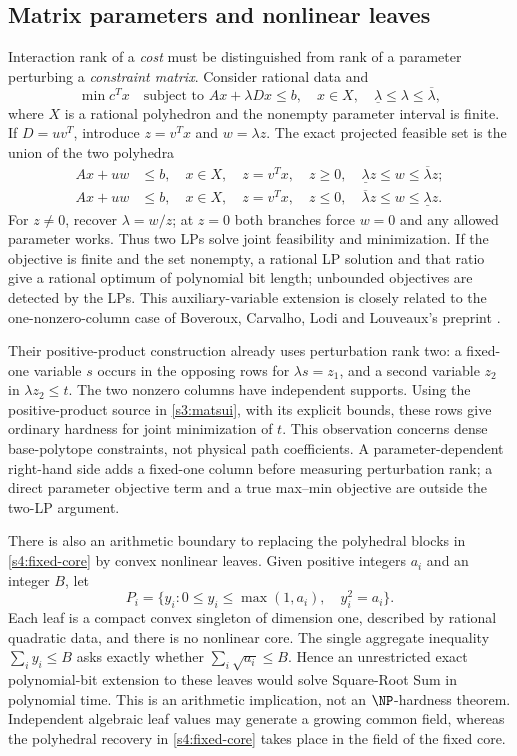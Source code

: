 \subsection{Matrix parameters and nonlinear leaves}\label{s6:parametric}
Interaction rank of a \emph{cost} must be distinguished from rank of a
parameter perturbing a \emph{constraint matrix}.
Consider rational data and
\[
 \min c^Tx\quad\text{subject to }Ax+\lambda Dx\le b,
 \quad x\in X,\quad\underline\lambda\le\lambda\le\overline\lambda,
\]
where $X$ is a rational polyhedron and the nonempty parameter interval
is finite. If $D=uv^T$, introduce $z=v^Tx$ and $w=\lambda z$.
The exact projected feasible set is the union of the two polyhedra
\begin{align*}
 Ax+uw&\le b,\quad x\in X,\quad z=v^Tx,\quad
 z\ge0,\quad\underline\lambda z\le w\le\overline\lambda z;\\
 Ax+uw&\le b,\quad x\in X,\quad z=v^Tx,\quad
 z\le0,\quad\overline\lambda z\le w\le\underline\lambda z.
\end{align*}
For $z\ne0$, recover $\lambda=w/z$; at $z=0$ both branches force
$w=0$ and any allowed parameter works. Thus two LPs solve joint
feasibility and minimization. If the objective is finite and the set
nonempty, a rational LP solution and that ratio give a rational optimum
of polynomial bit length; unbounded objectives are detected by the LPs.
This auxiliary-variable extension is closely related to the
one-nonzero-column case of Boveroux, Carvalho, Lodi and Louveaux's
preprint \cite[Section~3.3]{s6:boveroux2026}.

Their positive-product construction already uses perturbation rank two:
a fixed-one variable $s$ occurs in the opposing rows for
$\lambda s=z_1$, and a second variable $z_2$ in
$\lambda z_2\le t$. The two nonzero columns have independent supports.
Using the positive-product source in \cref{s3:matsui}, with its explicit
bounds, these rows give ordinary hardness for joint minimization of $t$.
This observation concerns dense base-polytope constraints, not physical
path coefficients. A parameter-dependent right-hand side adds a fixed-one
column before measuring perturbation rank; a direct parameter objective
term and a true max--min objective are outside the two-LP argument.

There is also an arithmetic boundary to replacing the polyhedral blocks
in \cref{s4:fixed-core} by convex nonlinear leaves. Given positive
integers $a_i$ and an integer $B$, let
\[
 P_i=\{y_i:0\le y_i\le\max(1,a_i),\quad y_i^2=a_i\}.
\]
Each leaf is a compact convex singleton of dimension one, described by
rational quadratic data, and there is no nonlinear core. The single
aggregate inequality $\sum_i y_i\le B$ asks exactly whether
$\sum_i\sqrt{a_i}\le B$. Hence an unrestricted exact polynomial-bit
extension to these leaves would solve Square-Root Sum in polynomial time.
This is an arithmetic implication, not an $\NP$-hardness theorem.
Independent algebraic leaf values may generate a growing common field,
whereas the polyhedral recovery in \cref{s4:fixed-core} takes place in
the field of the fixed core.


